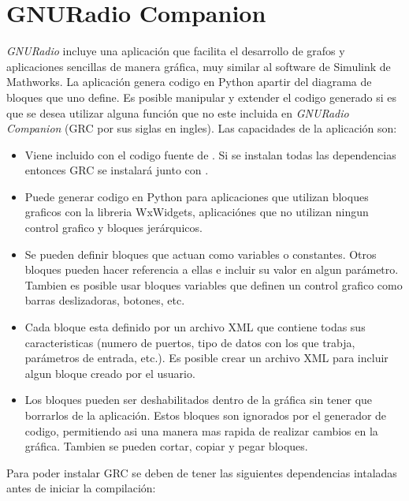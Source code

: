 
\chapter{GNURadio Companion}
\label{AppB}

\emph{GNURadio} incluye una aplicaci\'on que facilita el desarrollo de grafos y aplicaciones
sencillas de manera gr\'afica, muy similar al software de Simulink de Mathworks. La aplicaci\'on
genera codigo en Python apartir del diagrama de bloques que uno define. Es posible manipular y
extender el codigo generado si es que se desea utilizar alguna funci\'on que no este incluida en
\emph{GNURadio Companion}\cite{grc} (GRC por sus siglas en ingles). Las capacidades de la
aplicaci\'on son:

\begin{itemize}
  \item Viene incluido con el codigo fuente de \gnuradio. Si se instalan todas las dependencias
  entonces GRC se instalar\'a junto con \gnuradio.
  \item Puede generar codigo en Python para aplicaciones que utilizan bloques graficos con la
  libreria WxWidgets, aplicaci\'ones que no utilizan ningun control grafico y bloques jer\'arquicos.
  \item Se pueden definir bloques que actuan como variables o constantes. Otros bloques pueden hacer
  referencia a ellas e incluir su valor en algun par\'ametro. Tambien es posible usar bloques
  variables que definen un control grafico como barras deslizadoras, botones, etc.
  \item Cada bloque esta definido por un archivo XML que contiene todas sus caracteristicas (numero
  de puertos, tipo de datos con los que trabja, par\'ametros de entrada, etc.). Es posible crear un
  archivo XML para incluir algun bloque creado por el usuario.
  \item Los bloques pueden ser deshabilitados dentro de la gr\'afica sin tener que borrarlos de la
  aplicaci\'on. Estos bloques son ignorados por el generador de codigo, permitiendo asi una manera
  mas rapida de realizar cambios en la gr\'afica. Tambien se pueden cortar, copiar y pegar bloques.
\end{itemize}

Para poder instalar GRC se deben de tener las siguientes dependencias intaladas antes de iniciar la
compilaci\'on:

